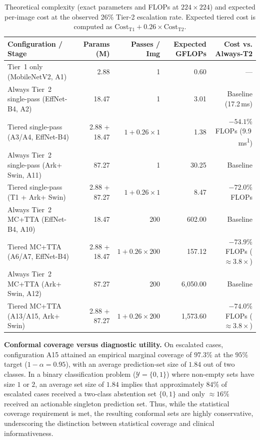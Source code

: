\documentclass[diagnostics,article,submit,moreauthors]{Definitions/mdpi}
\newcommand{\rev}[1]{#1}
\begin{document}
\begin{table}[H]
\caption{\rev{Theoretical complexity (exact parameters and FLOPs at $224{\times}224$) and expected per-image cost at the observed 26\% Tier-2 escalation rate. Expected tiered cost is computed as $\mathrm{Cost}_{\text{T1}} + 0.26 \times \mathrm{Cost}_{\text{T2}}$.}}\label{tab:efficiency}
\begin{tabular}{@{}lrrrr@{}}
\toprule
Configuration / Stage & Params (M) & Passes / Img & Expected GFLOPs & Cost vs. Always-T2\\
\midrule
Tier~1 only (MobileNetV2, A1) & 2.88 & 1 & 0.60 & ---\\
Always Tier~2 single-pass (EffNet-B4, A2) & 18.47 & 1 & 3.01 & Baseline (17.2\,ms)\\
Tiered single-pass (A3/A4, EffNet-B4) & 2.88 + 18.47 & $1 + 0.26\times 1$ & 1.38 & $-54.1\%$ FLOPs (9.9\,ms\textsuperscript{1})\\
Always Tier~2 single-pass (Ark+ Swin, A11) & 87.27 & 1 & 30.25 & Baseline\\
Tiered single-pass (T1 + Ark+ Swin) & 2.88 + 87.27 & $1 + 0.26\times 1$ & 8.47 & $-72.0\%$ FLOPs\\
\midrule
Always Tier~2 MC+TTA (EffNet-B4, A10) & 18.47 & 200 & 602.00 & Baseline\\
Tiered MC+TTA (A6/A7, EffNet-B4) & 2.88 + 18.47 & $1 + 0.26\times 200$ & 157.12 & $-73.9\%$ FLOPs ($\approx 3.8\times$)\\
Always Tier~2 MC+TTA (Ark+ Swin, A12) & 87.27 & 200 & 6,050.00 & Baseline\\
Tiered MC+TTA (A13/A15, Ark+ Swin) & 2.88 + 87.27 & $1 + 0.26\times 200$ & 1,573.60 & $-74.0\%$ FLOPs ($\approx 3.8\times$)\\
\bottomrule
\end{tabular}
\end{table}

\textbf{Conformal coverage versus diagnostic utility.} On escalated cases, configuration A15 attained an empirical marginal coverage of $97.3\%$ at the $95\%$ target ($1-\alpha=0.95$), with an average prediction-set size of $1.84$ out of two classes. \rev{In a binary classification problem ($\mathcal{Y}=\{0,1\}$) where non-empty sets have size $1$ or $2$, an average set size of $1.84$ implies that approximately $84\%$ of escalated cases received a two-class abstention set $\{0,1\}$ and only $\approx 16\%$ received an actionable singleton prediction set. Thus, while the statistical coverage requirement is met, the resulting conformal sets are highly conservative, underscoring the distinction between statistical coverage and clinical informativeness.}
\end{document}
